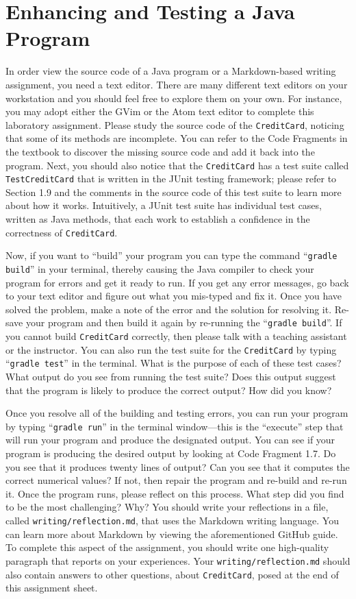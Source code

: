 \documentclass[11pt]{article}
\newcommand{\mainprogram}{\lstinline{CreditCard}}
\newcommand{\testprogram}{\lstinline{TestCreditCard}}
\newcommand{\reflection}{\lstinline{writing/reflection.md}}
\newcommand{\gradlebuild}{\command{gradle build}}
\newcommand{\gradletest}{\command{gradle test}}
\newcommand{\gradlerun}{\command{gradle run}}
\newcommand{\command}[1]{``\lstinline{#1}''}
\newcommand{\step}[1]{``{#1}''}
\begin{document}
\section*{Enhancing and Testing a Java Program}

In order view the source code of a Java program or a Markdown-based writing
assignment, you need a text editor. There are many different text editors on
your workstation and you should feel free to explore them on your own. For
instance, you may adopt either the GVim or the Atom text editor to complete this
laboratory assignment. Please study the source code of the \mainprogram,
noticing that some of its methods are incomplete. You can refer to the Code
Fragments in the textbook to discover the missing source code and add it back
into the program. Next, you should also notice that the \mainprogram{} has a
test suite called \testprogram{} that is written in the JUnit testing framework;
please refer to Section 1.9 and the comments in the source code of this test
suite to learn more about how it works. Intuitively, a JUnit test suite has
individual test cases, written as Java methods, that each work to establish a
confidence in the correctness of \mainprogram{}.

Now, if you want to \step{build} your program you can type the command
\gradlebuild{} in your terminal, thereby causing the Java compiler to check your
program for errors and get it ready to run. If you get any error messages, go
back to your text editor and figure out what you mis-typed and fix it. Once you
have solved the problem, make a note of the error and the solution for resolving
it. Re-save your program and then build it again by re-running the
\gradlebuild{}. If you cannot build \mainprogram{} correctly, then please talk
with a teaching assistant or the instructor. You can also run the test suite for
the \mainprogram{} by typing \gradletest{} in the terminal. What is the purpose
of each of these test cases? What output do you see from running the test suite?
Does this output suggest that the program is likely to produce the correct
output? How did you know?

Once you resolve all of the building and testing errors, you can run your
program by typing \gradlerun{} in the terminal window---this is the ``execute''
step that will run your program and produce the designated output. You can see
if your program is producing the desired output by looking at Code Fragment 1.7.
Do you see that it produces twenty lines of output? Can you see that it computes
the correct numerical values? If not, then repair the program and re-build and
re-run it. Once the program runs, please reflect on this process. What step did
you find to be the most challenging? Why? You should write your reflections in a
file, called \reflection{}, that uses the Markdown writing language. You can
learn more about Markdown by viewing the aforementioned GitHub guide. To
complete this aspect of the assignment, you should write one high-quality
paragraph that reports on your experiences. Your \reflection{} should also
contain answers to other questions, about \mainprogram{}, posed at the end of
this assignment sheet.
\end{document}
